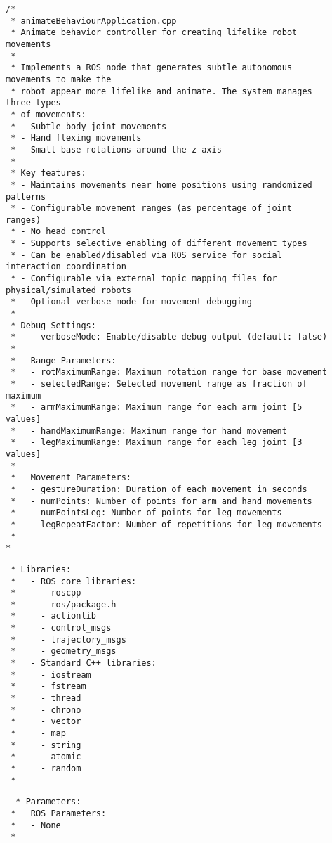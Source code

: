 \documentclass{CSSRforAfrica}
\newcommand{\checkboxChecked}{\fbox{\ding{51}}} %
\begin{document}
\begin{description}

\item[\checkboxChecked] 
 {\small 
\begin{verbatim}
/*
 * animateBehaviourApplication.cpp
 * Animate behavior controller for creating lifelike robot movements
 * 
 * Implements a ROS node that generates subtle autonomous movements to make the 
 * robot appear more lifelike and animate. The system manages three types 
 * of movements:
 * - Subtle body joint movements
 * - Hand flexing movements
 * - Small base rotations around the z-axis
 * 
 * Key features:
 * - Maintains movements near home positions using randomized patterns
 * - Configurable movement ranges (as percentage of joint ranges)
 * - No head control
 * - Supports selective enabling of different movement types
 * - Can be enabled/disabled via ROS service for social interaction coordination
 * - Configurable via external topic mapping files for physical/simulated robots
 * - Optional verbose mode for movement debugging
 * 
 * Debug Settings:
 *   - verboseMode: Enable/disable debug output (default: false)
 *   
 *   Range Parameters:
 *   - rotMaximumRange: Maximum rotation range for base movement 
 *   - selectedRange: Selected movement range as fraction of maximum 
 *   - armMaximumRange: Maximum range for each arm joint [5 values] 
 *   - handMaximumRange: Maximum range for hand movement 
 *   - legMaximumRange: Maximum range for each leg joint [3 values] 
 *   
 *   Movement Parameters:
 *   - gestureDuration: Duration of each movement in seconds 
 *   - numPoints: Number of points for arm and hand movements 
 *   - numPointsLeg: Number of points for leg movements 
 *   - legRepeatFactor: Number of repetitions for leg movements
 * 
*
\end{verbatim}}

\item[\checkboxChecked] 
 {\small 
\begin{verbatim}
 * Libraries:
 *   - ROS core libraries:
 *     - roscpp
 *     - ros/package.h
 *     - actionlib
 *     - control_msgs
 *     - trajectory_msgs
 *     - geometry_msgs
 *   - Standard C++ libraries:
 *     - iostream
 *     - fstream
 *     - thread
 *     - chrono
 *     - vector
 *     - map
 *     - string
 *     - atomic
 *     - random
 * 
\end{verbatim}}

\item[\checkboxChecked] 
 {\small 
\begin{verbatim}
  * Parameters:
 *   ROS Parameters:
 *   - None
 * 
\end{verbatim}}


\end{description}
\end{document}
